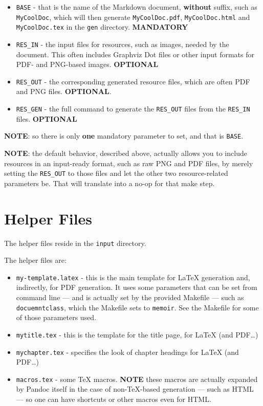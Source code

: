 \documentclass[oneside,]{memoir}
\begin{document}
\begin{itemize}
\item
  \texttt{BASE} - that is the name of the Markdown document,
  \textbf{without} suffix, such as \texttt{MyCoolDoc}, which will then
  generate \texttt{MyCoolDoc.pdf}, \texttt{MyCoolDoc.html} and
  \texttt{MyCoolDoc.tex} in the \texttt{gen} directory.
  \textbf{MANDATORY}
\item
  \texttt{RES\_IN} - the input files for resources, such as images,
  needed by the document. This often includes Graphviz Dot files or
  other input formats for PDF- and PNG-based images. \textbf{OPTIONAL}
\item
  \texttt{RES\_OUT} - the corresponding generated resource files, which
  are often PDF and PNG files. \textbf{OPTIONAL}.
\item
  \texttt{RES\_GEN} - the full command to generate the \texttt{RES\_OUT}
  files from the \texttt{RES\_IN} files. \textbf{OPTIONAL}
\end{itemize}
\textbf{NOTE}: so there is only \textbf{one} mandatory parameter to set,
and that is \texttt{BASE}.

\textbf{NOTE}: the default behavior, described above, actually allows
you to include resources in an input-ready format, such as raw PNG and
PDF files, by merely setting the \texttt{RES\_OUT} to those files and
let the other two resource-related parameters be. That will translate
into a no-op for that make step.

\section{Helper Files}

The helper files reside in the \texttt{input} directory.

The helper files are:

\begin{itemize}
\item
  \texttt{my-template.latex} - this is the main template for LaTeX
  generation and, indirectly, for PDF generation. It uses some
  parameters that can be set from command line --- and is actually set
  by the provided Makefile --- such as \texttt{docuemntclass}, which the
  Makefile sets to \texttt{memoir}. See the Makefile for some of those
  parameters used.
\item
  \texttt{mytitle.tex} - this is the template for the title page, for
  LaTeX (and PDF\ldots{})
\item
  \texttt{mychapter.tex} - specifies the look of chapter headings for
  LaTeX (and PDF\ldots{})
\item
  \texttt{macros.tex} - some TeX macros. \textbf{NOTE} these macros are
  actually expanded by Pandoc itself in the case of non-TeX-based
  generation --- such as HTML --- so one can have shortcuts or other
  macros even for HTML.
\end{itemize}
\end{document}
